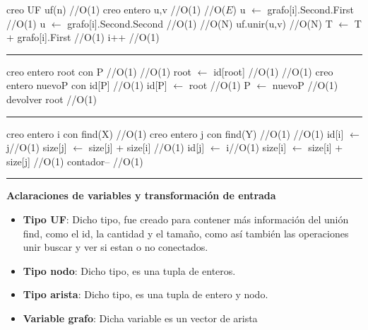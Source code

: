 \begin{algorithm}[H]
\caption{}
\begin{algorithmic}[1]
\state creo UF uf(n) \hfill //O(1)
\state creo entero u,v \hfill //O(1)
 \hfill //O($E$)
\state u $\gets$ grafo[i].Second.First \hfill //O(1)
\state u $\gets$ grafo[i].Second.Second \hfill //O(1)
 \hfill //O(N)
\state uf.unir(u,v) \hfill //O(N)
\state T $\gets$ T + grafo[i].First \hfill //O(1)
\endif
\state i++ \hfill //O(1)
\endwhile
\EndFunction 
\end{algorithmic}
\hrule
\complejidad{  }
\end{algorithm}

\begin{algorithm}[H]
\caption{}
\begin{algorithmic}[1]
\state creo entero root con P \hfill //O(1)
 \hfill //O(1)
\state root $\gets$ id[root] \hfill //O(1)
\endwhile
{} \hfill //O(1)
\state creo entero nuevoP con id[P] \hfill //O(1)
\state id[P] $\gets$ root \hfill //O(1)
\state P $\gets$ nuevoP \hfill //O(1)
\endwhile
\state devolver root \hfill //O(1)
\EndFunction 
\end{algorithmic}
\hrule
{}
\end{algorithm}

\begin{algorithm}[H]
\caption{}
\begin{algorithmic}[1]
\state creo entero i con find(X) \hfill //O(1)
\state creo entero j con find(Y) \hfill //O(1)
 \hfill //O(1)
\state id[i] $\gets$ j\hfill //O(1)
\state size[j] $\gets$ size[j] + size[i] \hfill //O(1)
\Else
\state id[j] $\gets$ i\hfill //O(1)
\state size[i] $\gets$ size[i] + size[j] \hfill //O(1)	
\endif
\state contador-- \hfill //O(1)	
\EndFunction 
\end{algorithmic}
\hrule
{}
\end{algorithm}


\textbf{Aclaraciones de variables y transformaci\'on de entrada}

\begin{itemize}
\item {\bf Tipo UF}: Dicho tipo, fue creado para contener m\'as informaci\'on del uni\'on find, como el id, la cantidad y el tamaño, como as\'i tambi\'en las operaciones unir buscar y ver si estan o no conectados.
\item {\bf Tipo nodo}: Dicho tipo, es una tupla de enteros.
\item {\bf Tipo arista}: Dicho tipo, es una tupla de entero y nodo.
\item {\bf Variable grafo}: Dicha variable es un vector de arista
\end{itemize}  

